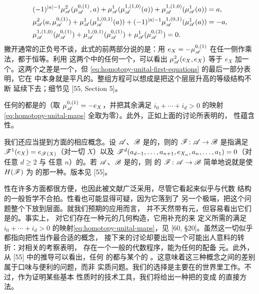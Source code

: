\begin{itemize}
\begin{equation}
\begin{aligned}
&(-1)^{|a|-1}\mu^2_{\mathscr{A}}(\mu^{0,(1)}_{\mathscr{A}},a)
+\mu^1_{\mathscr{A}}(\mu^{1,(1,0)}_{\mathscr{A}}(a))
+\mu^{1,(1,0)}_{\mathscr{A}}(\mu^1_{\mathscr{A}}(a))=a,\\
&\mu^2_{\mathscr{A}}(a,\mu^{0,(1)}_{\mathscr{A}})
+\mu^1_{\mathscr{A}}(\mu^{1,(0,1)}_{\mathscr{A}}(a))
+(-1)^{|a|-1}\mu^{1,(0,1)}_{\mathscr{A}}(\mu^1_{\mathscr{A}}(a))=-a,\\
&\mu^{1,(1,0)}_{\mathscr{A}}(\mu^{0,(1)}_{\mathscr{A}})
+\mu^{1,(0,1)}_{\mathscr{A}}(\mu^{0,(1)}_{\mathscr{A}})
+\mu^1_{\mathscr{A}}(\mu^{0,(2)}_{\mathscr{A}})=0.
\end{aligned}
\end{equation}
撇开通常的正负号不谈，此式的前两部分说的是：用\trCocycle
$e_X=-\mu^{0,(1)}_{\mathscr{A}}$ 在任一侧作乘法，都\trChainHomotopy{}于恒等。利用
这两个\trChainHomotopy{}中的任何一个，可以看出 $\mu^2_{\mathscr{A}}(e_X,e_X)$ 等于
$e_X$ 加一个\trCoboundary。这两个\trCoboundary{}之差是一个\trCocycle，但
\eqref{eq:homotopy-unital-first-equations} 的最后一部分表明，它在\trCohomology{}%
中本身就是平凡的。整组方程可以想成是把这个层层升高的\trHomotopy{}等级结构不断
延续下去；细节见 [55, Section 5]。
\end{itemize}

任何\trStrictlyUnital{}的\trACategory{}都是\trHomotopy\trUnital{}的（取
$\mu^{0,(1)}_{\mathscr{A}}=-e_X$，并把其余满足 $i_0+\cdots+i_d>0$ 的映射
\eqref{eq:homotopy-unital-maps} 全取为零）。此外，正如上面的讨论所表明的，
\trHomotopy\trUnital{}性蕴含\trCunital{}性。

我们还应当提到\trFunctor{}方面的相应概念。设 $\mathscr{A}$、$\mathscr{B}$ 是\trStrictlyUnital{}的，则\trStrictlyUnital{}的%
\trAFunctor{} $\mathscr{F}\colon\mathscr{A}\to\mathscr{B}$ 是指满足
$\mathscr{F}^1(e_X)=e_{\mathscr{F}(X)}$（对一切\trObject{} $X$）以及
$\mathscr{F}^d(a_{d-1},\ldots,a_{n+1},e_{X_n},a_n,\ldots,a_1)=0$（对任意 $d\ge 2$ 与%
任意 $n$）的\trAFunctor。若 $\mathscr{A}$、$\mathscr{B}$ 是\trCunital{}的，则 \trCunital{}%
的\trAFunctor{} $\mathscr{F}\colon\mathscr{A}\to\mathscr{B}$ 简单地说就是使 $H(\mathscr{F})$ 为%
\trUnital{}的那一种。\trHomotopy\trUnital{}版本见 [55]。

\trStrictlyUnital{}性在许多方面都很方便，也因此被文献广泛采用，尽管它看起来似乎与\trHomotopy{}代数
结构的一般哲学不合拍。\trCunital{}性\trApriori{}看也可能显得可疑，因为它落到了
另一个极端，把这个问题整个下放到\trCohomology{}层面。就我们预期的应用而言，
\trFukayaCategory{}并不天然带有\trStrictlyUnital{}元，但容易看出它们是\trCunital{}的。事实上，
对它们存在一种\trHomotopy\trUnital{}元的几何构造，它用补充的\trModuliSpace{}来
定义所需的满足 $i_0+\cdots+i_d>0$ 的映射\eqref{eq:homotopy-unital-maps}，见
[60, \S20]。虽然这一切似乎都指向把\trHomotopy\trUnital{}性当作最合适的概念，
接下来的讨论却要出现一个可能出人意料的转折：对相关\trObstruction{}的考察表明，
存在一个一般的代数程序，能为任何\trCunital{}的\trACategory{}配备%
\trHomotopy\trUnital{}元。此外，从 [55] 中的推导可以看出，任何%
\trHomotopy\trUnital{}的\trACategory{}都与某个\trStrictlyUnital{}的\trACategory{}
\trQuasiisomorphism。这意味着这三种概念之间的差别属于口味与便利的问题，而非
实质问题。我们的选择是主要在\trCunital{}的世界里工作。不过，作为证明某些基本
性质时的技术工具，我们将给出一种把\trCunital{}的\trACategory{}变成\trStrictlyUnital{}%
\trACategory{}的直接方法。

